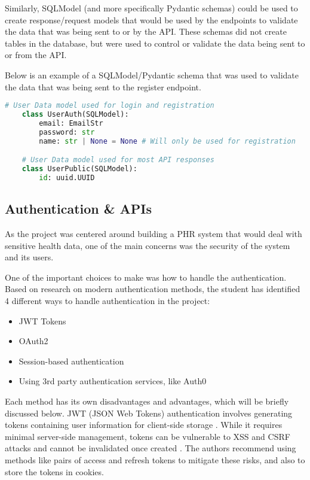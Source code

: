 Similarly, SQLModel (and more specifically Pydantic schemas) could be used to create response/request models that would be used by the endpoints to validate the data that was being sent to or by the API. These schemas did not create tables in the database, but were used to control or validate the data being sent to or from the API.

Below is an example of a SQLModel/Pydantic schema that was used to validate the data that was being sent to the register endpoint.

\begin{lstlisting}[language=Python, caption=SQLModel Auth Schema]
    # User Data model used for login and registration
    class UserAuth(SQLModel):
        email: EmailStr
        password: str
        name: str | None = None # Will only be used for registration

    # User Data model used for most API responses
    class UserPublic(SQLModel):
        id: uuid.UUID
\end{lstlisting}

\subsection{Authentication \& APIs}

As the project was centered around building a PHR system that would deal with sensitive health data, one of the main concerns was the security of the system and its users. 

One of the important choices to make was how to handle the authentication. Based on research on modern authentication methods, the student has identified 4 different ways to handle authentication in the project:

\begin{itemize}
    \item JWT Tokens
    \item OAuth2
    \item Session-based authentication
    \item Using 3rd party authentication services, like Auth0
\end{itemize}

Each method has its own disadvantages and advantages, which will be briefly discussed below.
JWT (JSON Web Tokens) authentication involves generating tokens containing user information for client-side storage \parencite{auth1}. While it requires minimal server-side management, tokens can be vulnerable to XSS and CSRF attacks and cannot be invalidated once created \parencite{auth1, auth2}. The authors recommend using methods like pairs of access and refresh tokens to mitigate these risks, and also to store the tokens in cookies.


